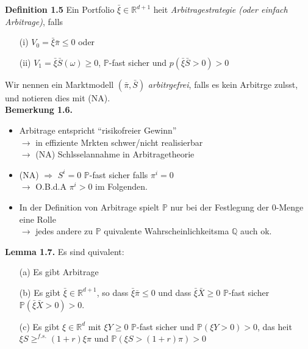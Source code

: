 \documentclass[envcountsame,envcountchap,envcountsect,amsart]{svmono}
\begin{document}
	\textbf{Definition 1.5} Ein Portfolio $\bar{\xi}\in \mathds{R}^{d+1}$ heit \textit{Arbitragestrategie (oder einfach Arbitrage)}, falls
\begin{enumerate}
	\item[(i)]$V_0=\bar{\xi}\bar{\pi}\leq 0$ oder\vspace*{.1cm}\\
	\item[(ii)] $V_1=\bar{\xi}\bar{S}\left(\omega\right)\geq 0$, $\mathbb{P}$-fast sicher und $p\left(\bar{\xi}\bar{S}>0\right)>0$
\end{enumerate}
Wir nennen ein Marktmodell $\left(\bar{\pi},\bar{S}\right)$ \textit{arbitrgefrei}, falls es kein Arbitrge zulsst, und notieren dies mit (NA).
\vspace*{.2cm}\\
\textbf{Bemerkung 1.6.}
\begin{itemize}
	\item Arbitrage entspricht "`risikofreier Gewinn"'\vspace*{.1cm}\\
	$\rightarrow$ in effiziente Mrkten schwer/nicht realisierbar\vspace*{.1cm}\\
	$\rightarrow$ (NA) Schlsselannahme in Arbitragetheorie
	\item (NA) $\Rightarrow$ $S^i=0$ $\mathbb{P}$-fast sicher falls $\pi^i=0$\vspace*{.1cm}\\
	$\rightarrow$ O.B.d.A $\pi^i>0$ im Folgenden.
	\item In der Definition von Arbitrage spielt $\mathbb{P}$ nur bei der Festlegung der $0$-Menge eine Rolle\vspace*{.1cm}\\
	$\rightarrow$ jedes andere zu $\mathbb{P}$ quivalente Wahrscheinlichkeitsma $\mathbb{Q}$ auch ok.
\end{itemize}
\textbf{Lemma 1.7.} Es sind quivalent:
\begin{enumerate}
	\item[(a)] Es gibt Arbitrage
	\item[(b)] Es gibt $\bar{\xi}\in \mathds{R}^{d+1}$, so dass $\bar{\xi}\bar{\pi}\leq 0$ und dass $\bar{\xi}\bar{X}\geq 0$ $\mathbb{P}$-fast sicher $\mathbb{P}\left(\bar{\xi}\bar{X}>0\right)>0$.
	\item[(c)] Es gibt $\xi\in \mathds{R}^d$ mit $\xi Y\geq 0$ $\mathbb{P}$-fast sicher und $\mathbb{P}\left(\xi Y>0\right)>0$, das heit $\xi S\geq^{f.s.}\left(1+r\right)\xi\pi$ und $\mathbb{P}\left(\xi S>\left(1+r\right)\pi\right)>0$
\end{enumerate}
\end{document}
